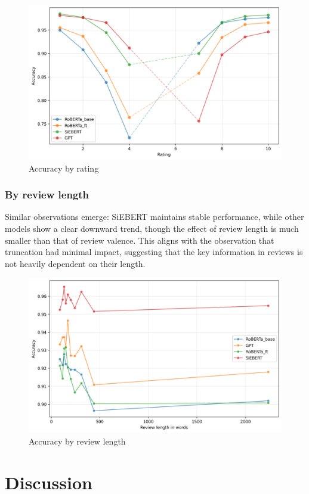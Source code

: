 \documentclass{article}
\begin{document}
\begin{figure}
  \centering
  \includegraphics[width=\textwidth]{accuracy_vs_ratings.png}
  \caption{Accuracy by rating}
  \label{fig:roberta-accuracy-ratings}
\end{figure}

\subsubsection{By review length}

Similar observations emerge: SiEBERT maintains stable performance, while other models show a clear downward trend, though the effect of review length is much smaller than that of review valence. This aligns with the observation that truncation had minimal impact, suggesting that the key information in reviews is not heavily dependent on their length.

\begin{figure}
  \centering
  \includegraphics[width=\textwidth]{accuracy_vs_wordcount.png}
  \caption{Accuracy by review length}
  \label{fig:roberta-accuracy-length}
\end{figure}

\section{Discussion}



\end{document}
